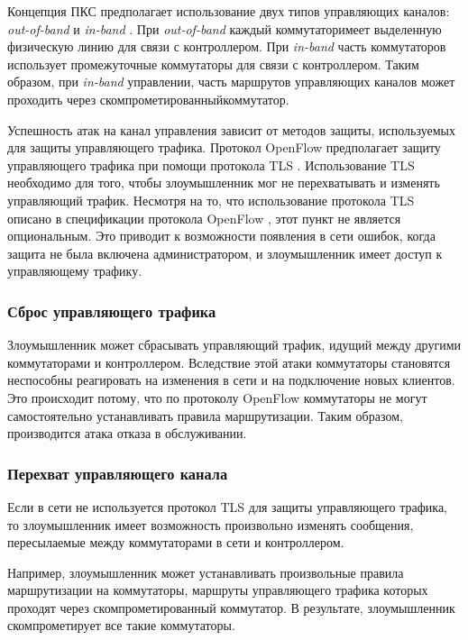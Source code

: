 \documentclass[../thesis.tex]{subfiles}
\begin{document}
Концепция ПКС предполагает использование двух типов управляющих каналов: \textit{out-of-band} и \textit{in-band} \cite{kim2015band}.
При \textit{out-of-band} каждый коммутатор\linebreak имеет выделенную физическую линию для связи с контроллером.
При \textit{in-band} часть коммутаторов использует промежуточные коммутаторы для связи с контроллером.
Таким образом, при \textit{in-band} управлении, часть маршрутов управляющих каналов может проходить через скомпрометированный\linebreak коммутатор.

Успешность атак на канал управления зависит от методов защиты, используемых для защиты управляющего трафика.
Протокол OpenFlow предполагает защиту управляющего трафика при помощи протокола TLS \cite{turner2014transport}.
Использование TLS необходимо для того, чтобы злоумышленник мог не перехватывать и изменять управляющий трафик.
Несмотря на то, что использование протокола TLS описано в спецификации протокола OpenFlow \cite{openflow15}, этот пункт не является опциональным.
Это приводит к возможности появления в сети ошибок, когда защита не была включена администратором, и злоумышленник имеет доступ к управляющему трафику.

\subsubsection{Сброс управляющего трафика}

Злоумышленник может сбрасывать управляющий трафик, идущий между другими коммутаторами и контроллером.
Вследствие этой атаки коммутаторы становятся неспособны реагировать на изменения в сети и на подключение новых клиентов.
Это происходит потому, что по протоколу OpenFlow коммутаторы не могут самостоятельно устанавливать правила маршрутизации.
Таким образом, производится атака отказа в обслуживании.

\subsubsection{Перехват управляющего канала}

Если в сети не используется протокол TLS для защиты управляющего трафика, то злоумышленник имеет возможность произвольно изменять сообщения, пересылаемые между коммутаторами в сети и контроллером.

Например, злоумышленник может устанавливать произвольные правила маршрутизации на коммутаторы, маршруты управляющего трафика которых проходят через скомпрометированный коммутатор.
В результате, злоумышленник скомпрометирует все такие коммутаторы.
\end{document}
